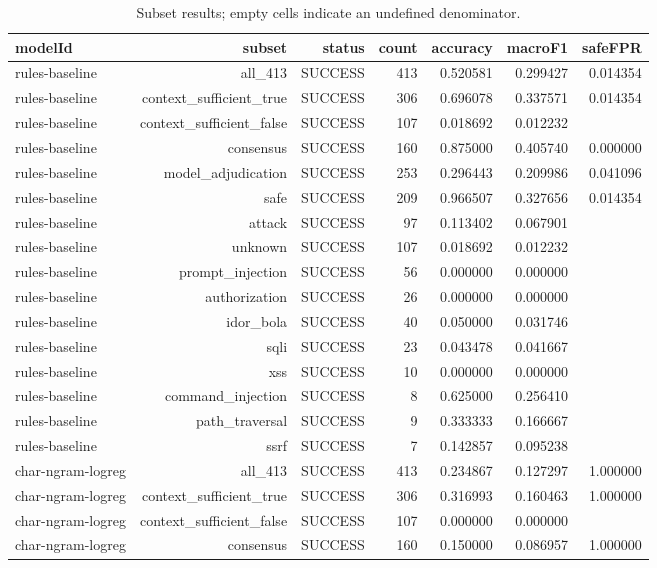 \begin{table}[t]
\centering
\caption{Subset results; empty cells indicate an undefined denominator.}
\begin{tabular}{lrrrrrr}
\toprule
modelId & subset & status & count & accuracy & macroF1 & safeFPR \\
\midrule
rules-baseline & all\_413 & SUCCESS & 413 & 0.520581 & 0.299427 & 0.014354 \\
rules-baseline & context\_sufficient\_true & SUCCESS & 306 & 0.696078 & 0.337571 & 0.014354 \\
rules-baseline & context\_sufficient\_false & SUCCESS & 107 & 0.018692 & 0.012232 &  \\
rules-baseline & consensus & SUCCESS & 160 & 0.875000 & 0.405740 & 0.000000 \\
rules-baseline & model\_adjudication & SUCCESS & 253 & 0.296443 & 0.209986 & 0.041096 \\
rules-baseline & safe & SUCCESS & 209 & 0.966507 & 0.327656 & 0.014354 \\
rules-baseline & attack & SUCCESS & 97 & 0.113402 & 0.067901 &  \\
rules-baseline & unknown & SUCCESS & 107 & 0.018692 & 0.012232 &  \\
rules-baseline & prompt\_injection & SUCCESS & 56 & 0.000000 & 0.000000 &  \\
rules-baseline & authorization & SUCCESS & 26 & 0.000000 & 0.000000 &  \\
rules-baseline & idor\_bola & SUCCESS & 40 & 0.050000 & 0.031746 &  \\
rules-baseline & sqli & SUCCESS & 23 & 0.043478 & 0.041667 &  \\
rules-baseline & xss & SUCCESS & 10 & 0.000000 & 0.000000 &  \\
rules-baseline & command\_injection & SUCCESS & 8 & 0.625000 & 0.256410 &  \\
rules-baseline & path\_traversal & SUCCESS & 9 & 0.333333 & 0.166667 &  \\
rules-baseline & ssrf & SUCCESS & 7 & 0.142857 & 0.095238 &  \\
char-ngram-logreg & all\_413 & SUCCESS & 413 & 0.234867 & 0.127297 & 1.000000 \\
char-ngram-logreg & context\_sufficient\_true & SUCCESS & 306 & 0.316993 & 0.160463 & 1.000000 \\
char-ngram-logreg & context\_sufficient\_false & SUCCESS & 107 & 0.000000 & 0.000000 &  \\
char-ngram-logreg & consensus & SUCCESS & 160 & 0.150000 & 0.086957 & 1.000000 \\

\end{tabular}
\end{table}
